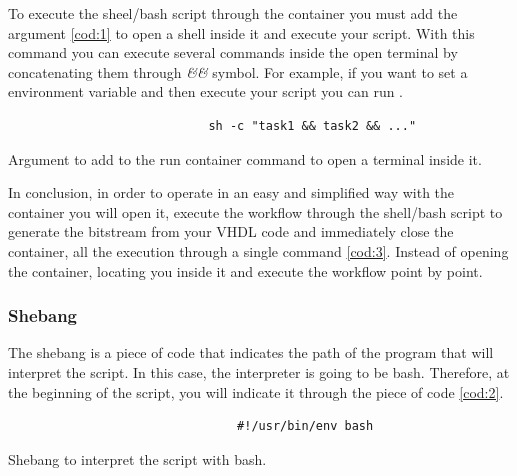 \vspace{5mm}

\noindent To execute the sheel/bash script through the container you must add the argument \ref{cod:1} to open a shell inside it and execute your script. 
With this command you can execute several commands inside the open terminal by concatenating them through \textit{\&\&} symbol. 
For example, if you want to set a environment variable and then execute your script you can run .

\begin{code}
\begin{verbatim}
                            sh -c "task1 && task2 && ..."
\end{verbatim}
\caption{Argument to add to the run container command to open a terminal inside it.}
\label{cod:1}
\end{code}

\vspace{5mm}

\noindent In conclusion, in order to operate in an easy and simplified way with the container you will open it, execute the workflow through the shell/bash script to generate the bitstream from your VHDL code and immediately close the container, all the execution through a single command \ref{cod:3}.
Instead of opening the container, locating you inside it and execute the workflow point by point.

\subsubsection{Shebang}

\label{shebang}

The shebang is a piece of code that indicates the path of the program that will interpret the script.
In this case, the interpreter is going to be bash.
Therefore, at the beginning of the script, you will indicate it through the piece of code \ref{cod:2}.

\vspace{10mm}

\begin{code}
\begin{verbatim}
                                #!/usr/bin/env bash
\end{verbatim}
\caption{Shebang to interpret the script with bash.}
\label{cod:2}
\end{code}


